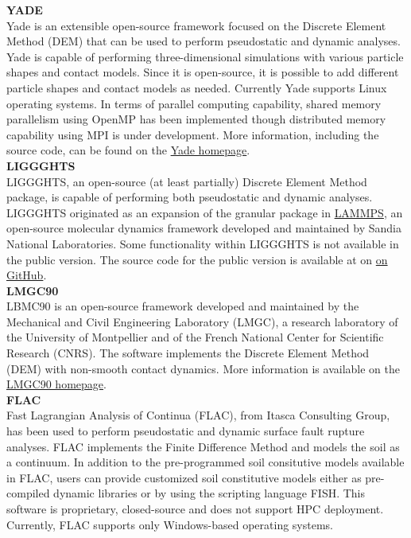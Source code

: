 \noindent \textbf{YADE} \\
Yade is an extensible open-source framework focused on the Discrete Element Method (DEM) \citep{yade2005doc} that can be used to perform pseudostatic and dynamic analyses. Yade is capable of performing three-dimensional simulations with various particle shapes and contact models. Since it is open-source, it is possible to add different particle shapes and contact models as needed. Currently Yade supports Linux operating systems. In terms of parallel computing capability, shared memory parallelism using OpenMP has been implemented though distributed memory capability using MPI is under development. More information, including the source code, can be found on the \href{https://yade-dem.org/doc/}{Yade homepage}.\\

\noindent\textbf{LIGGGHTS}\\
LIGGGHTS, an open-source (at least partially) Discrete Element Method package, is capable of performing both pseudostatic and dynamic analyses. LIGGGHTS originated as an expansion of the granular package in \href{https://lammps.sandia.gov/}{LAMMPS}, an open-source molecular dynamics framework developed and maintained by Sandia National Laboratories. Some functionality within LIGGGHTS is not available in the public version. The source code for the public version is available at on \href{https://github.com/CFDEMproject/LIGGGHTS-PUBLIC}{on GitHub}.\\

\noindent\textbf{LMGC90}\\
 LBMC90 is an open-source framework developed and maintained by the Mechanical and Civil Engineering Laboratory (LMGC), a research laboratory of the University of Montpellier and of the French National Center for Scientific Research (CNRS). The software implements the Discrete Element Method (DEM) with non-smooth contact dynamics. More information is available on the \href{http://mimetics-engineering.fr/index.php/en/lmgc90-2/}{LMGC90 homepage}.\\

\noindent\textbf{FLAC}\\
Fast Lagrangian Analysis of Continua (FLAC), from Itasca Consulting Group, has been used to perform pseudostatic and dynamic surface fault rupture analyses. FLAC implements the Finite Difference Method and models the soil as a continuum. In addition to the pre-programmed soil consitutive models available in FLAC, users can provide customized soil constitutive models either as pre-compiled dynamic libraries or by using the scripting language FISH. This software is proprietary, closed-source and does not support HPC deployment. Currently, FLAC supports only Windows-based operating systems.\\

